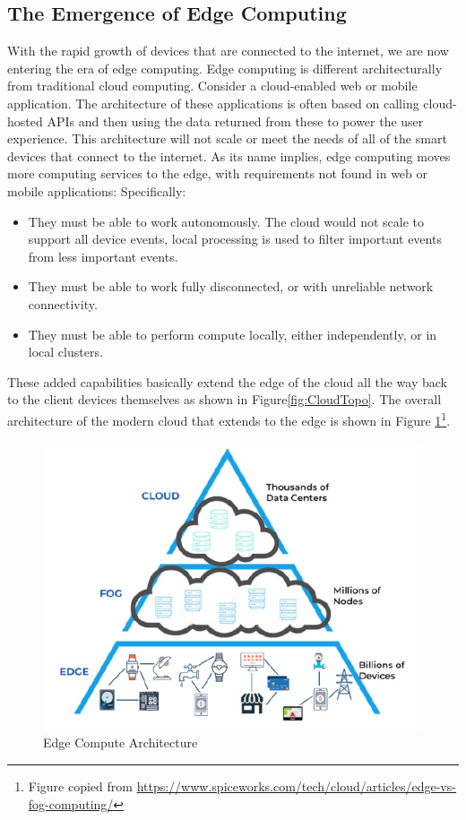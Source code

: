 \documentclass[conference]{IEEEtran}
\begin{document}
\subsection{The Emergence of Edge Computing}

With the rapid growth of devices that are connected to the internet, we are now entering the era of edge computing\cite{edgecomputing}. Edge computing is  different architecturally from traditional cloud computing.  Consider a cloud-enabled web or mobile application.  The architecture of these applications is often based on calling cloud-hosted APIs and then using the data returned from these to power the user experience.  This architecture will not scale or meet the needs of all of the smart devices that connect to the internet.  As its name implies, edge computing moves more computing services to the edge, with requirements not found in web or mobile applications:  Specifically:

\begin{itemize}
	\item They must be able to work autonomously. The cloud would not scale to support all device events, local processing is used to filter important events from less important events.
	
	\item They must be able to work fully disconnected, or with unreliable network connectivity.  
	
	\item They must be able to perform compute locally, either independently, or in local clusters. 
\end{itemize}

These added capabilities basically extend the edge of the cloud all the way back to the client devices themselves as shown in Figure\ref{fig:CloudTopo}. The overall architecture of the modern cloud that extends to the edge is shown in Figure \ref{fig:EdgeArchitecture}\footnote{Figure copied from \url{https://www.spiceworks.com/tech/cloud/articles/edge-vs-fog-computing/}}.


\begin{figure}
	\includegraphics[width=\columnwidth]{images/EdgeArchitecture}	
	\caption{Edge Compute Architecture}
	\label{fig:EdgeArchitecture}
\end{figure}
\end{document}
